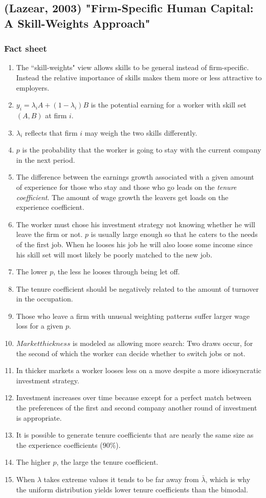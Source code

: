 \documentclass[12pt,a4paper]{article}
\begin{document}
  \subsection{(Lazear, 2003) "Firm-Specific Human Capital: A Skill-Weights Approach"} %
  \subsubsection{Fact sheet} %
  \begin{enumerate}
    \item The ``skill-weights" view allows skills to be general instead of firm-specific. Instead the relative importance of skills makes them more or less attractive to employers.
    \item $y_i = \lambda_i A+(1-\lambda_i)B$ is the potential earning for a worker with skill set $(A, B)$ at firm $i$.
    \item $\lambda_i$ reflects that firm $i$ may weigh the two skills differently.
    \item $p$ is the probability that the worker is going to stay with the current company in the next period.
    \item The difference between the earnings growth associated with a given amount of experience for those who stay and those who go leads on the \emph{tenure coefficient}. The amount of wage growth the leavers get loads on the experience coefficient.
    \item The worker must chose his investment strategy not knowing whether he will leave the firm or not. $p$ is usually large enough so that he caters to the needs of the first job. When he looses his job he will also loose some income since his skill set will most likely be poorly matched to the new job.
    \item The lower $p$, the less he looses through being let off.
    \item The tenure coefficient should be negatively related to the amount of turnover in the occupation.
    \item Those who leave a firm with unusual weighting patterns suffer larger wage loss for a given $p$.
    \item $Market thickness$ is modeled as allowing more search: Two draws occur, for the second of which the worker can decide whether to switch jobs or not.
    \item In thicker markets a worker looses less on a move despite a more idiosyncratic investment strategy.
    \item Investment increases over time because except for a perfect match between the preferences of the first and second company another round of investment is appropriate.
    \item It is possible to generate tenure coefficients that are nearly the same size as the experience coefficients ($90\%$).
    \item The higher $p$, the large the tenure coefficient.
    \item When $\lambda$ takes extreme values it tends to be far away from $\bar{\lambda}$, which is why the uniform distribution yields lower tenure coefficients than the bimodal.
  \end{enumerate}
\end{document}
